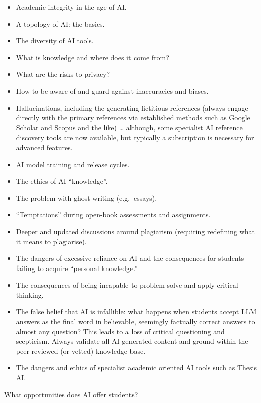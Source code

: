 \documentclass[
  10t,
]{article}
\providecommand{\tightlist}{%
  \setlength{\itemsep}{0pt}\setlength{\parskip}{0pt}}
\begin{document}
\begin{itemize}
\tightlist
\item
  Academic integrity in the age of AI.
\item
  A topology of AI: the basics.
\item
  The diversity of AI tools.
\item
  What is knowledge and where does it come from?
\item
  What are the risks to privacy?
\item
  How to be aware of and guard against inaccuracies and biases.
\item
  Hallucinations, including the generating fictitious references (always
  engage directly with the primary references via established methods
  such as Google Scholar and Scopus and the like) \ldots{} although,
  some specialist AI reference discovery tools are now available, but
  typically a subscription is necessary for advanced features.
\item
  AI model training and release cycles.
\item
  The ethics of AI ``knowledge''.
\item
  The problem with ghost writing (e.g.~essays).
\item
  ``Temptations'' during open-book assessments and assignments.
\item
  Deeper and updated discussions around plagiarism (requiring redefining
  what it means to plagiarise).
\item
  The dangers of excessive reliance on AI and the consequences for
  students failing to acquire ``personal knowledge.''
\item
  The consequences of being incapable to problem solve and apply
  critical thinking.
\item
  The false belief that AI is infallible: what happens when students
  accept LLM answers as the final word in believable, seemingly
  factually correct answers to almost any question? This leads to a loss
  of critical questioning and scepticism. Always validate all AI
  generated content and ground within the peer-reviewed (or vetted)
  knowledge base.
\item
  The dangers and ethics of specialist academic oriented AI tools such
  as Thesis AI.
\end{itemize}

What opportunities does AI offer students?
\end{document}
